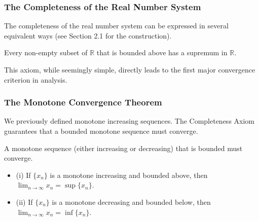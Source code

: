 \subsubsection{The Completeness of the Real Number System}

The completeness of the real number system can be expressed in several equivalent ways (see Section 2.1 for the construction).

\begin{theorem}
\label{thm:completeness_en}
Every non-empty subset of $\mathbb{R}$ that is bounded above has a supremum in $\mathbb{R}$.
\end{theorem}

This axiom, while seemingly simple, directly leads to the first major convergence criterion in analysis.

\subsubsection{The Monotone Convergence Theorem}

We previously defined monotone increasing sequences. The Completeness Axiom guarantees that a bounded monotone sequence must converge.

\begin{theorem}
\label{thm:mct_en}
A monotone sequence (either increasing or decreasing) that is bounded must converge.
\begin{itemize}
    \item (i) If $\{x_n\}$ is a monotone increasing and bounded above, then $\lim_{n \to \infty} x_n = \sup \{x_n\}$.
    \item (ii) If $\{x_n\}$ is a monotone decreasing and bounded below, then $\lim_{n \to \infty} x_n = \inf \{x_n\}$.
\end{itemize}
\end{theorem}

